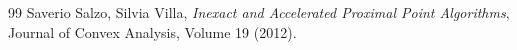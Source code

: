 \begin{thebibliography}{99}
     Saverio Salzo, Silvia Villa, \textit{Inexact and Accelerated Proximal Point Algorithms}, Journal of Convex Analysis, Volume 19 (2012).
\end{thebibliography}